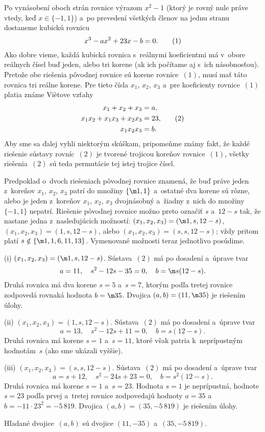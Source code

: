 {%
Po vynásobení oboch strán rovnice výrazom $x^2-1$
(ktorý je rovný nule práve vtedy, keď $x\in\{{-1},1\}$) a~po prevedení
všetkých členov na jednu stranu dostaneme kubickú rovnicu
$$
x^3-ax^2+23x-b=0.
\tag1
$$
Ako dobre vieme, každá kubická rovnica s~reálnymi koeficientmi má
v~obore reálnych čísel buď jeden, alebo tri korene
(ak ich počítame aj s~ich násobnosťou). Pretože obe riešenia pôvodnej
rovnice sú korene rovnice~$(1)$, musí mať táto rovnica
tri reálne korene.
Pre tieto čísla $x_1$, $x_2$, $x_3$ a~pre koeficienty rovnice~$(1)$
platia známe Vi\`etove vzťahy
$$
\aligned
x_1+x_2+x_3&=a,\\
x_1x_2+x_1x_3+x_2x_3&=23,\\
x_1x_2x_3&=b.
\endaligned\tag2
$$
Aby sme sa ďalej vyhli niektorým skúškam, pripomeňme známy fakt,
že každé riešenie sústavy rovníc~$(2)$ je tvorené trojicou
koreňov rovnice~$(1)$, všetky riešenia~$(2)$ sú teda permutácie tej istej
trojice čísel.

Predpoklad o~dvoch riešeniach pôvodnej rovnice znamená, že buď práve
jeden z~koreňov $x_1$, $x_2$, $x_3$ patrí do množiny $\{\m1,1\}$
a~ostatné dva korene sú rôzne, alebo je jeden z~koreňov $x_1$,
$x_2$, $x_3$ dvojnásobný a~žiadny z~nich do množiny $\{{-1},1\}$
nepatrí. Riešenie pôvodnej rovnice možno preto označiť $s$ a~$12-s$
tak, že nastane jedna z~nasledujúcich možností:
$(x_1,x_2,x_3)=(\m1,s,12-s)$, $(x_1,x_2,x_3)=(1,s,12-s)$, alebo
$(x_1,x_2,x_3)=(s,s,12-s)$; vždy pritom platí
$s\notin\{\m1,1,6,11,13\}$. Vymenované možnosti teraz jednotlivo
posúdime.

\smallskip
(i) $(x_1,x_2,x_3)=(\m1,s,12-s)$. Sústava~$(2)$ má po dosadení
a~úprave tvar
$$
a=11,\quad s^2-12s-35=0,\quad b=\m s(12-s).
$$
Druhá rovnica má dva korene $s=5$ a~$s=7$, ktorým podľa tretej rovnice
zodpovedá rovnaká hodnota $b=\m35$. Dvojica $(a,b)=(11,\m35)$ je
riešením úlohy.

\smallskip
(ii) $(x_1,x_2,x_3)=(1,s,12-s)$. Sústava~$(2)$ má po dosadení
a~úprave tvar
$$
a=13,\quad s^2-12s+11=0,\quad b=s(12-s).
$$
Druhá rovnica má korene $s=1$ a~$s=11$, ktoré však patria
k~neprípustným hodnotám~$s$ (ako sme ukázali vyššie).

\smallskip
(iii) $(x_1,x_2,x_3)=(s,s,12-s)$. Sústava~$(2)$ má po dosadení
a~úprave tvar
$$
a=s+12,\quad s^2-24s+23=0,\quad b=s^2(12-s).
$$
Druhá rovnica má korene $s=1$ a~$s=23$. Hodnota $s=1$ je
neprípustná, hodnote $s=23$ podľa prvej a~tretej rovnice
zodpovedajú hodnoty $a=35$ a~$b={-11}\cdot23^2={-5\,819}$. Dvojica
$(a,b)=(35,{-5\,819})$ je riešením úlohy.

\smallskip
Hľadané dvojice~$(a,b)$ sú dvojice $(11,{-35})$ a~$(35,{-5\,819})$.}

